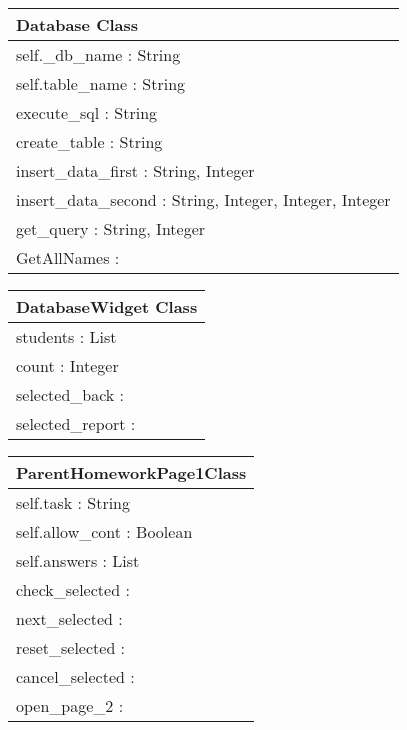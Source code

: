 \begin{center}
\begin{tabular}{|p{7cm}|} \hline
\textbf{Database Class} \\ \hline
self.\_db\_name : String \\
self.table\_name : String \\ \hline
execute\_sql : String \\
create\_table : String \\
insert\_data\_first : String, Integer \\
insert\_data\_second : String, Integer, Integer, Integer \\
get\_query : String, Integer \\
GetAllNames : \\ \hline
\end{tabular}
\end{center}

\begin{center}
\begin{tabular}{|p{7cm}|} \hline
\textbf{DatabaseWidget Class} \\ \hline
students : List \\
count : Integer \\ \hline
selected\_back : \\
selected\_report : \\ \hline
\end{tabular}
\end{center}

\begin{center}
\begin{tabular}{|p{7cm}|} \hline
\textbf{ParentHomeworkPage1Class} \\ \hline
self.task : String \\
self.allow\_cont : Boolean \\
self.answers : List \\ \hline
check\_selected : \\
next\_selected : \\
reset\_selected : \\
cancel\_selected : \\
open\_page\_2 : \\ \hline
\end{tabular}
\end{center}

